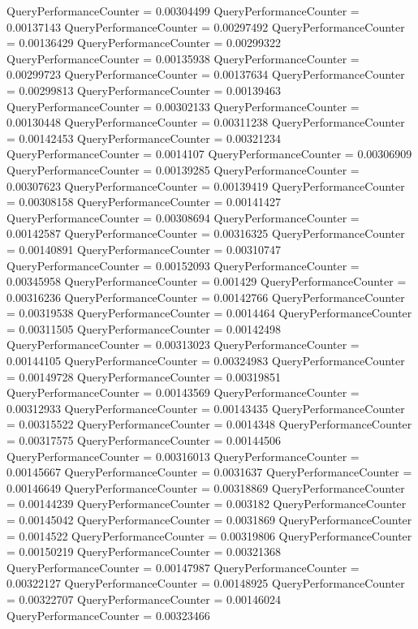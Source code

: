 \documentclass[9pt]{article}
\theoremstyle{plain}
\theoremstyle{definition}
\theoremstyle{remark}
\numberwithin{equation}{section}
\begin{document}
QueryPerformanceCounter  =  0.00304499
QueryPerformanceCounter  =  0.00137143
QueryPerformanceCounter  =  0.00297492
QueryPerformanceCounter  =  0.00136429
QueryPerformanceCounter  =  0.00299322
QueryPerformanceCounter  =  0.00135938
QueryPerformanceCounter  =  0.00299723
QueryPerformanceCounter  =  0.00137634
QueryPerformanceCounter  =  0.00299813
QueryPerformanceCounter  =  0.00139463
QueryPerformanceCounter  =  0.00302133
QueryPerformanceCounter  =  0.00130448
QueryPerformanceCounter  =  0.00311238
QueryPerformanceCounter  =  0.00142453
QueryPerformanceCounter  =  0.00321234
QueryPerformanceCounter  =  0.0014107
QueryPerformanceCounter  =  0.00306909
QueryPerformanceCounter  =  0.00139285
QueryPerformanceCounter  =  0.00307623
QueryPerformanceCounter  =  0.00139419
QueryPerformanceCounter  =  0.00308158
QueryPerformanceCounter  =  0.00141427
QueryPerformanceCounter  =  0.00308694
QueryPerformanceCounter  =  0.00142587
QueryPerformanceCounter  =  0.00316325
QueryPerformanceCounter  =  0.00140891
QueryPerformanceCounter  =  0.00310747
QueryPerformanceCounter  =  0.00152093
QueryPerformanceCounter  =  0.00345958
QueryPerformanceCounter  =  0.001429
QueryPerformanceCounter  =  0.00316236
QueryPerformanceCounter  =  0.00142766
QueryPerformanceCounter  =  0.00319538
QueryPerformanceCounter  =  0.0014464
QueryPerformanceCounter  =  0.00311505
QueryPerformanceCounter  =  0.00142498
QueryPerformanceCounter  =  0.00313023
QueryPerformanceCounter  =  0.00144105
QueryPerformanceCounter  =  0.00324983
QueryPerformanceCounter  =  0.00149728
QueryPerformanceCounter  =  0.00319851
QueryPerformanceCounter  =  0.00143569
QueryPerformanceCounter  =  0.00312933
QueryPerformanceCounter  =  0.00143435
QueryPerformanceCounter  =  0.00315522
QueryPerformanceCounter  =  0.0014348
QueryPerformanceCounter  =  0.00317575
QueryPerformanceCounter  =  0.00144506
QueryPerformanceCounter  =  0.00316013
QueryPerformanceCounter  =  0.00145667
QueryPerformanceCounter  =  0.0031637
QueryPerformanceCounter  =  0.00146649
QueryPerformanceCounter  =  0.00318869
QueryPerformanceCounter  =  0.00144239
QueryPerformanceCounter  =  0.003182
QueryPerformanceCounter  =  0.00145042
QueryPerformanceCounter  =  0.0031869
QueryPerformanceCounter  =  0.0014522
QueryPerformanceCounter  =  0.00319806
QueryPerformanceCounter  =  0.00150219
QueryPerformanceCounter  =  0.00321368
QueryPerformanceCounter  =  0.00147987
QueryPerformanceCounter  =  0.00322127
QueryPerformanceCounter  =  0.00148925
QueryPerformanceCounter  =  0.00322707
QueryPerformanceCounter  =  0.00146024
QueryPerformanceCounter  =  0.00323466
\end{document}
